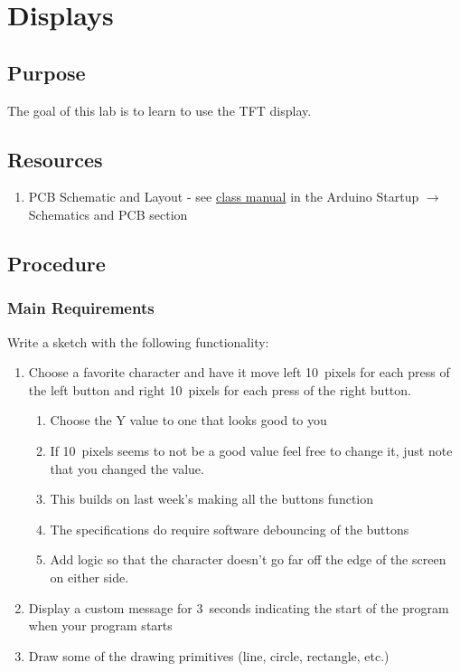 \chapter{Displays}

\section{Purpose}
The goal of this lab is to learn to use the TFT display.

\section{Resources}\label{sec:displaysresources}
\begin{enumerate}
    \item PCB Schematic and Layout - see 
            \href{https://github.com/semcneil/Fundamentals-of-Microcontrollers-Manual}{class manual} 
            in the Arduino Startup $\rightarrow$ Schematics and PCB section
\end{enumerate}

\section{Procedure}
\subsection{Main Requirements}
Write a sketch with the following functionality:
\begin{enumerate}
    \item Choose a favorite character and have it move left 10~pixels for each press
            of the left button and right 10~pixels for each press of the right button.
    \begin{enumerate}
        \item Choose the Y value to one that looks good to you
        \item If 10~pixels seems to not be a good value feel free to change it, just note
                that you changed the value.
        \item This builds on last week's making all the buttons function
        \item The specifications do require software debouncing of the buttons
        \item Add logic so that the character doesn't go far off the edge of the screen
                on either side.
    \end{enumerate}
    \item Display a custom message for 3~seconds indicating the start of the program when
            your program starts 
    \item Draw some of the drawing primitives (line, circle, rectangle, etc.)
\end{enumerate}

